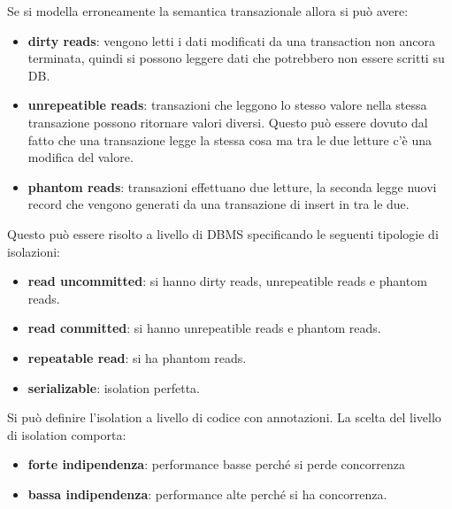 Se si modella erroneamente la semantica transazionale allora si può avere:
\begin{itemize}
    \item \textbf{dirty reads}: vengono letti i dati modificati da una transaction
    non ancora terminata, quindi si possono leggere dati che potrebbero non essere
    scritti su DB.
    \item \textbf{unrepeatible reads}: transazioni che leggono lo stesso valore nella
    stessa transazione possono ritornare valori diversi. Questo può essere dovuto
    dal fatto che una transazione legge la stessa cosa ma tra le due letture c'è 
    una modifica del valore.
    \item \textbf{phantom reads}: transazioni effettuano due letture, la seconda
    legge nuovi record che vengono generati da una transazione di insert in tra le due.
\end{itemize}
Questo può essere risolto a livello di DBMS specificando le seguenti tipologie 
di isolazioni:
\begin{itemize}
      \item \textbf{read uncommitted}: si hanno dirty reads, unrepeatible reads e
      phantom reads.
      \item \textbf{read committed}: si hanno unrepeatible reads e phantom reads.
      \item \textbf{repeatable read}: si ha phantom reads.
      \item \textbf{serializable}: isolation perfetta.
\end{itemize}
Si può definire l'isolation a livello di codice con annotazioni. La scelta del livello
di isolation comporta:
\begin{itemize}
    \item \textbf{forte indipendenza}: performance basse perché si perde concorrenza
    \item \textbf{bassa indipendenza}: performance alte perché si ha concorrenza.
\end{itemize} 